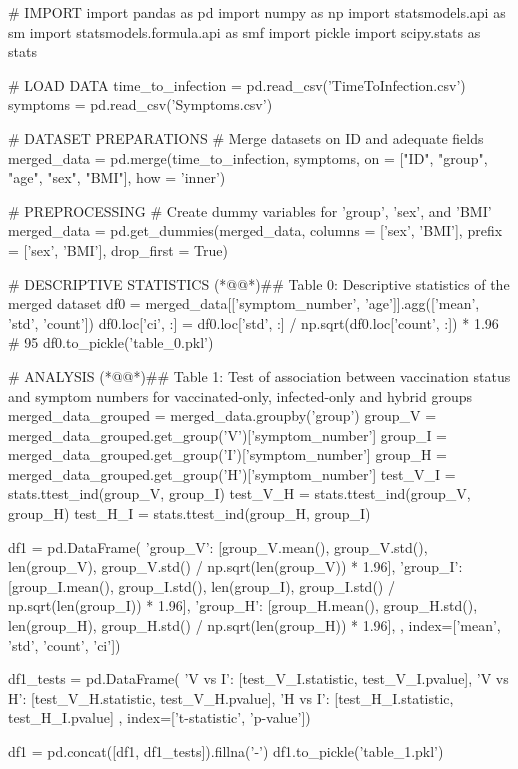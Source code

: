 \documentclass[11pt]{article}
\begin{document}
\begin{python}

# IMPORT
import pandas as pd
import numpy as np
import statsmodels.api as sm
import statsmodels.formula.api as smf
import pickle
import scipy.stats as stats

# LOAD DATA
time_to_infection = pd.read_csv('TimeToInfection.csv')
symptoms = pd.read_csv('Symptoms.csv')

# DATASET PREPARATIONS
# Merge datasets on ID and adequate fields
merged_data = pd.merge(time_to_infection, symptoms, on = ["ID", "group", "age", "sex", "BMI"], how = 'inner')

# PREPROCESSING
# Create dummy variables for 'group', 'sex', and 'BMI'
merged_data = pd.get_dummies(merged_data, columns = ['sex', 'BMI'], prefix = ['sex', 'BMI'], drop_first = True)

# DESCRIPTIVE STATISTICS
(*@@*)## Table 0: Descriptive statistics of the merged dataset
df0 = merged_data[['symptom_number', 'age']].agg(['mean', 'std', 'count'])
df0.loc['ci', :] = df0.loc['std', :] / np.sqrt(df0.loc['count', :]) * 1.96  # 95%
df0.to_pickle('table_0.pkl')

# ANALYSIS
(*@@*)## Table 1: Test of association between vaccination status and symptom numbers for vaccinated-only, infected-only and hybrid groups
merged_data_grouped = merged_data.groupby('group')
group_V = merged_data_grouped.get_group('V')['symptom_number']
group_I = merged_data_grouped.get_group('I')['symptom_number']
group_H = merged_data_grouped.get_group('H')['symptom_number']
test_V_I = stats.ttest_ind(group_V, group_I)
test_V_H = stats.ttest_ind(group_V, group_H)
test_H_I = stats.ttest_ind(group_H, group_I)

df1 = pd.DataFrame({
    'group_V': [group_V.mean(), group_V.std(), len(group_V), group_V.std() / np.sqrt(len(group_V)) * 1.96],
    'group_I': [group_I.mean(), group_I.std(), len(group_I), group_I.std() / np.sqrt(len(group_I)) * 1.96],
    'group_H': [group_H.mean(), group_H.std(), len(group_H), group_H.std() / np.sqrt(len(group_H)) * 1.96],
}, index=['mean', 'std', 'count', 'ci'])

df1_tests = pd.DataFrame({
    'V vs I': [test_V_I.statistic, test_V_I.pvalue], 
    'V vs H': [test_V_H.statistic, test_V_H.pvalue], 
    'H vs I': [test_H_I.statistic, test_H_I.pvalue]
}, index=['t-statistic', 'p-value'])

df1 = pd.concat([df1, df1_tests]).fillna('-')
df1.to_pickle('table_1.pkl')


\end{python}
\end{document}

